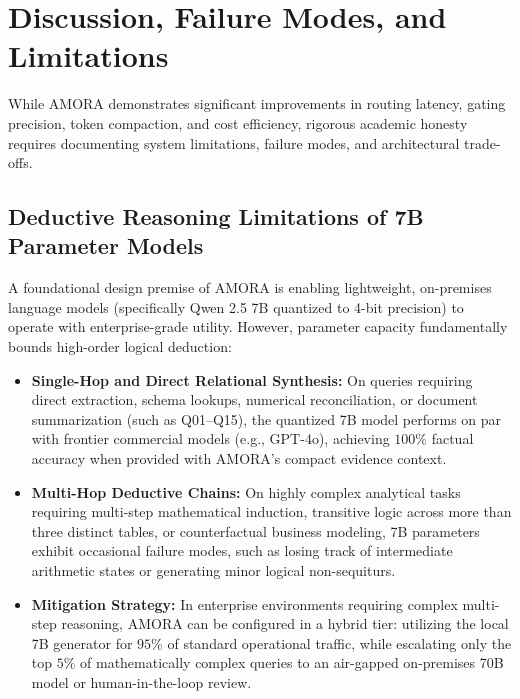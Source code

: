 \section{Discussion, Failure Modes, and Limitations}
\label{sec:limitations}

While AMORA demonstrates significant improvements in routing latency, gating precision, token compaction, and cost efficiency, rigorous academic honesty requires documenting system limitations, failure modes, and architectural trade-offs.

\subsection{Deductive Reasoning Limitations of 7B Parameter Models}
A foundational design premise of AMORA is enabling lightweight, on-premises language models (specifically Qwen 2.5 7B quantized to 4-bit precision) to operate with enterprise-grade utility. However, parameter capacity fundamentally bounds high-order logical deduction:
\begin{itemize}
    \item \textbf{Single-Hop and Direct Relational Synthesis:} On queries requiring direct extraction, schema lookups, numerical reconciliation, or document summarization (such as Q01--Q15), the quantized 7B model performs on par with frontier commercial models (e.g., GPT-4o), achieving $100\%$ factual accuracy when provided with AMORA's compact evidence context.
    \item \textbf{Multi-Hop Deductive Chains:} On highly complex analytical tasks requiring multi-step mathematical induction, transitive logic across more than three distinct tables, or counterfactual business modeling, 7B parameters exhibit occasional failure modes, such as losing track of intermediate arithmetic states or generating minor logical non-sequiturs.
    \item \textbf{Mitigation Strategy:} In enterprise environments requiring complex multi-step reasoning, AMORA can be configured in a hybrid tier: utilizing the local 7B generator for $95\%$ of standard operational traffic, while escalating only the top $5\%$ of mathematically complex queries to an air-gapped on-premises 70B model or human-in-the-loop review.
\end{itemize}

